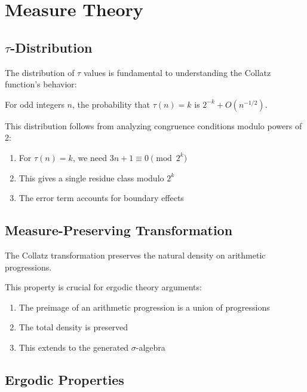 \section{Measure Theory}\label{sec:measure_theory}

\subsection{$\tau$-Distribution}

The distribution of $\tau$ values is fundamental to understanding the Collatz function's behavior:

\begin{theorem}\label{thm:tau_dist}
For odd integers $n$, the probability that $\tau(n) = k$ is $2^{-k} + O(n^{-1/2})$.
\end{theorem}

This distribution follows from analyzing congruence conditions modulo powers of 2:
\begin{enumerate}
\item For $\tau(n) = k$, we need $3n + 1 \equiv 0 \pmod{2^k}$
\item This gives a single residue class modulo $2^k$
\item The error term accounts for boundary effects
\end{enumerate}

\subsection{Measure-Preserving Transformation}

\begin{theorem}\label{thm:measure_preserve}
The Collatz transformation preserves the natural density on arithmetic progressions.
\end{theorem}

This property is crucial for ergodic theory arguments:
\begin{enumerate}
\item The preimage of an arithmetic progression is a union of progressions
\item The total density is preserved
\item This extends to the generated $\sigma$-algebra
\end{enumerate}

\subsection{Ergodic Properties}

